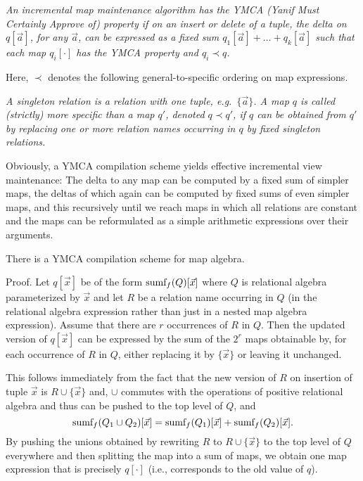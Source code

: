 \begin{definition}\em
An incremental map maintenance algorithm has the YMCA
(Yanif Must Certainly Approve of)
property if on an insert or delete of a tuple, the delta on $q[\vec{a}]$, for
any $\vec{a}$, can be expressed as a fixed sum
$q_1[\vec{a}] + \dots + q_k[\vec{a}]$ such that each map $q_i[\cdot]$ has the YMCA
property and $q_i \prec q$.
\end{definition}


Here, $\prec$ denotes the following general-to-specific ordering on map expressions.


\begin{definition}\em
A singleton relation is a relation with one tuple, e.g.\ $\{\vec{a}\}$.
A map $q$ is called (strictly) {\em more specific than}\/ a map $q'$,
denoted $q \prec q'$, if $q$ can be obtained from $q'$ by replacing
one or more relation names occurring in $q$ by fixed singleton relations.
\end{definition}


Obviously, a YMCA compilation scheme yields effective incremental view maintenance:
The delta to any map can be computed by a fixed sum of simpler maps,
the deltas of which again can be computed by fixed sums of even simpler maps,
and this recursively until we reach maps in which all relations are constant and
the maps can be reformulated as a simple arithmetic expressions over their
arguments.



\begin{theorem}
There is a YMCA compilation scheme for map algebra.
\end{theorem}


Proof.
Let $q[\vec{x}]$ be of the form
$
\mbox{sumf}_f(Q)[\vec{x}]
$
where $Q$ is relational algebra parameterized by $\vec{x}$ and let $R$ be
a relation name occurring in $Q$ (in the relational algebra expression
rather than just in a nested map algebra expression).
Assume that there are $r$ occurrences of $R$ in $Q$. Then
the updated version of $q[\vec{x}]$ can be expressed by the sum of the $2^r$
maps obtainable by, for each occurrence of $R$ in $Q$, either replacing it
by $\{ \vec{x} \}$ or leaving it unchanged.

This follows immediately from the fact that the new version of $R$ on insertion of
tuple $\vec{x}$ is $R \cup \{ \vec{x} \}$ and, $\cup$ commutes with
the operations of positive relational algebra and thus can be pushed to the top
level of $Q$, and
\[
\mbox{sumf}_f(Q_1 \cup Q_2)[\vec{x}] =
\mbox{sumf}_f(Q_1)[\vec{x}] + \mbox{sumf}_f(Q_2)[\vec{x}].
\]
By pushing the unions obtained by rewriting $R$ to $R \cup \{\vec{x}\}$ to the
top level of $Q$ everywhere and then splitting the map into a sum of maps, we obtain
one map expression that is precisely $q[\cdot]$ (i.e., corresponds to the old
value of $q$).

